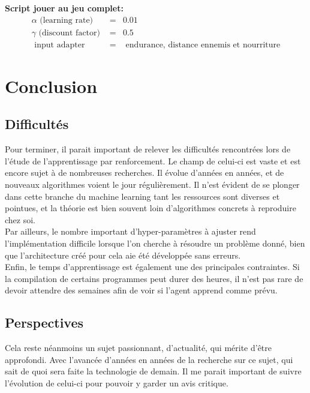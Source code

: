 \documentclass[11pt,a4paper]{report}
\begin{document}
   \textbf{Script jouer au jeu complet:}
   \begin{eqnarray}
   \alpha \text{ (learning rate) } &=& 0.01 \\
   \gamma \text{ (discount factor) } &=& 0.5 \\
   \text{ input adapter } &=& \text{ endurance, distance ennemis et nourriture}
   \end{eqnarray}   
  
  \chapter{Conclusion}
  
  \section{Difficultés}
  
  \par Pour terminer, il parait important de relever les difficultés rencontrées lors de l'étude de l'apprentissage par renforcement. Le champ de celui-ci est vaste et est encore sujet à de nombreuses recherches. Il évolue d'années en années, et de nouveaux algorithmes voient le jour régulièrement. Il n'est évident de se plonger dans cette branche du machine learning tant les ressources sont diverses et pointues, et la théorie est bien souvent loin d'algorithmes concrets à reproduire chez soi. \\
  Par ailleurs, le nombre important d'hyper-paramètres à ajuster rend l'implémentation difficile lorsque l'on cherche à résoudre un problème donné, bien que l'architecture créé pour cela aie été développée sans erreurs. \\
  Enfin, le temps d'apprentissage est également une des principales contraintes. Si la compilation de certains programmes peut durer des heures, il n'est pas rare de devoir attendre des semaines afin de voir si l'agent apprend comme prévu. 
  
  \section{Perspectives}
  
   \par Cela reste néanmoins un sujet passionnant, d'actualité, qui mérite d'être approfondi. Avec l'avancée d'années en années de la recherche sur ce sujet, qui sait de quoi sera faite la technologie de demain. Il me parait important de suivre l'évolution de celui-ci pour pouvoir y garder un avis critique. 
\end{document}

